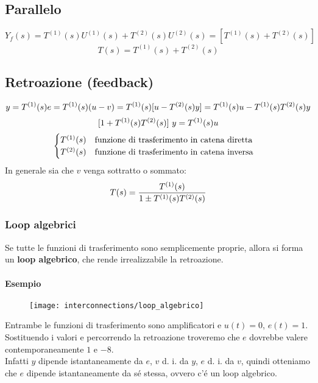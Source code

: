 \documentclass[../main.tex]{subfiles}
\begin{document}
	\subsection{Parallelo}
	\[ Y_f(s) = T^{(1)}(s)U^{(1)}(s) + T^{(2)}(s)U^{(2)}(s) = \left[ T^{(1)}(s) + T^{(2)}(s) \right] \]
	\[ T(s) = T^{(1)}(s) + T^{(2)}(s) \]
	\subsection{Retroazione (feedback)}
	\[ y= T^{(1)}(s)e = T^{(1)}(s)(u-v) = T^{(1)}(s)[u-T^{(2)}(s)y] = T^{(1)}(s)u - T^{(1)}(s)T^{(2)}(s)y \]
	\[ [1+T^{(1)}(s)T^{(2)}(s)]\ y = T^{(1)}(s)u \]
	\[ \begin{cases}
		T^{(1)}(s) \quad \text{funzione di trasferimento in catena diretta}\\
		T^{(2)}(s) \quad \text{funzione di trasferimento in catena inversa}
	\end{cases} \]
	In generale sia che $ v $ venga sottratto o sommato:
	\[ T(s) = \frac{T^{(1)}(s)}{1\pm T^{(1)}(s)T^{(2)}(s)} \]
	\subsubsection{Loop algebrici}
	Se tutte le funzioni di trasferimento sono semplicemente proprie, allora si forma un \textbf{loop algebrico}, che rende irrealizzabile la retroazione.
	\paragraph{Esempio}
	\begin{wrapfigure}{R}{.5\linewidth}%
		\centering
		\texttt{[image: interconnections/loop\_algebrico]}%
	\end{wrapfigure}
	\leavevmode%
	Entrambe le funzioni di trasferimento sono amplificatori e $ u(t) = 0 $, $ e(t) =1 $.\\
	Sostituendo i valori e percorrendo la retroazione troveremo che $ e $ dovrebbe valere contemporaneamente $ 1 $ e $ -8 $.\\
	Infatti $ y $ dipende istantaneamente da $ e $, $ v $ d. i. da $ y $, $ e $ d. i. da $ v $, quindi otteniamo che $ e $ dipende istantaneamente da s\'e stessa, ovvero c'\'e un loop algebrico.
	\pagebreak
\end{document}
